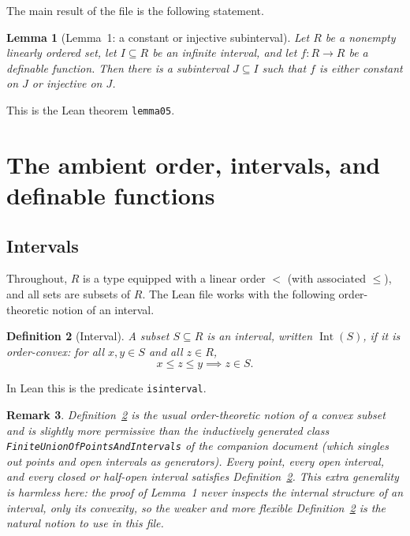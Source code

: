\documentclass[11pt]{article}
\newtheorem{definition}{Definition}[section]
\newtheorem{lemma}[definition]{Lemma}
\newtheorem{remark}[definition]{Remark}
\newcommand{\Lean}[1]{\texttt{\begingroup\def\_{\textunderscore\discretionary{}{}{}}#1\endgroup}}
\newcommand{\Int}{\operatorname{Int}}
\begin{document}
The main result of the file is the following statement.
 
\begin{lemma}[Lemma~1: a constant or injective subinterval]\label{lem:main}
Let $R$ be a nonempty linearly ordered set, let $I\subseteq R$ be an infinite interval, and let
$f:R\to R$ be a definable function. Then there is a subinterval $J\subseteq I$ such that $f$ is
either constant on $J$ or injective on $J$.
\end{lemma}
 
This is the Lean theorem \Lean{lemma\_0\_5}.
 
\section{The ambient order, intervals, and definable functions}\label{sec:order-and-functions}
 
\subsection{Intervals}
 
Throughout, $R$ is a type equipped with a linear order $<$ (with associated $\le$), and all sets
are subsets of $R$. The Lean file works with the following order-theoretic notion of an interval.
 
\begin{definition}[Interval]\label{def:interval}
A subset $S\subseteq R$ is an \emph{interval}, written $\Int(S)$, if it is order-convex: for all
$x,y\in S$ and all $z\in R$,
\[
  x\le z\le y \implies z\in S.
\]
\end{definition}
 
In Lean this is the predicate \Lean{is\_interval}.
 
\begin{remark}
Definition~\ref{def:interval} is the usual order-theoretic notion of a convex subset and is
slightly more permissive than the inductively generated class \Lean{FiniteUnionOfPointsAndIntervals}
of the companion document (which singles out points and \emph{open} intervals as generators).
Every point, every open interval, and every closed or half-open interval satisfies
Definition~\ref{def:interval}. This extra generality is harmless here: the proof of Lemma~1 never
inspects the internal structure of an interval, only its convexity, so the weaker and more
flexible Definition~\ref{def:interval} is the natural notion to use in this file.
\end{remark}
 
\end{document}
